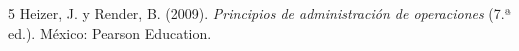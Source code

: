 \documentclass[../main]{subfiles}
\begin{document}
\begin{thebibliography}{5}
  Heizer, J. y Render, B. (2009).
  \textit{Principios de administración de operaciones} (7.ª ed.).
  México: Pearson Education.
\end{thebibliography}
\end{document}
